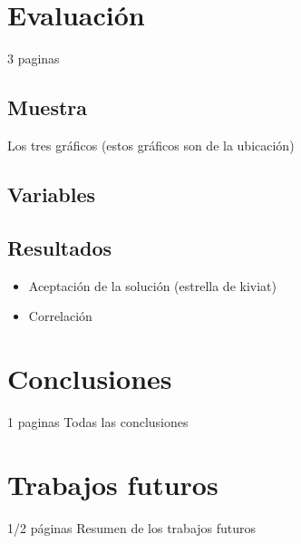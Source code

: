\documentclass[conference]{IEEEtran}
\begin{document}
\section{Evaluación}
3 paginas
\subsection{Muestra}
Los tres gráficos (estos gráficos son de la ubicación)
\subsection{Variables}
\subsection{Resultados}
\begin{itemize}
\item Aceptación de la solución (estrella de kiviat)
\item Correlación
\end{itemize}

\section{Conclusiones}
1 paginas
Todas las conclusiones

\section{Trabajos futuros}
1/2 páginas
Resumen de los trabajos futuros

\printbibliography{}
\end{document}
